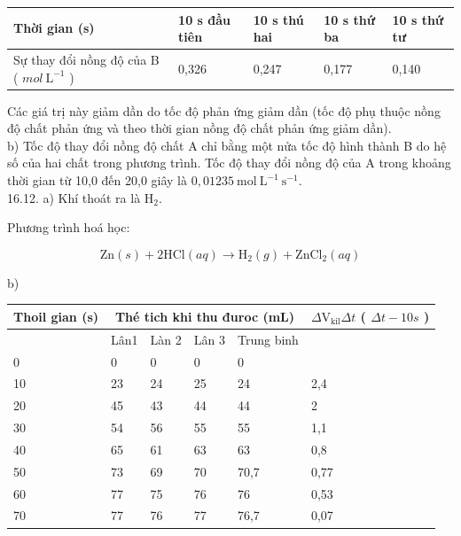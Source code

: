 \documentclass[10pt]{article}
\begin{document}
\begin{center}
\begin{tabular}{|l|l|l|l|l|}
\hline
Thời gian (s) & 10 s đầu tiên & 10 s thú hai & 10 s thứ ba & 10 s thứ tư \\
\hline
Sự thay đổi nồng độ của B ( $m o l \mathrm{~L}^{-1}$ ) & 0,326 & 0,247 & 0,177 & 0,140 \\
\hline
\end{tabular}
\end{center}

Các giá trị này giảm dần do tốc độ phản ứng giảm dần (tốc độ phụ thuộc nồng độ chất phản ứng và theo thời gian nồng độ chất phản ứng giảm dần).\\
b) Tốc độ thay đổi nồng độ chất A chỉ bằng một nửa tốc độ hình thành B do hệ số của hai chất trong phương trình. Tốc độ thay đổi nồng độ của A trong khoảng thời gian từ 10,0 đến 20,0 giây là $0,01235 \mathrm{~mol} \mathrm{~L}^{-1} \mathrm{~s}^{-1}$.\\
16.12. a) Khí thoát ra là $\mathrm{H}_{2}$.

Phương trình hoá học:

$$
\mathrm{Zn}(s)+2 \mathrm{HCl}(a q) \rightarrow \mathrm{H}_{2}(g)+\mathrm{ZnCl}_{2}(a q)
$$

b)

\begin{center}
\begin{tabular}{|l|l|l|l|l|l|}
\hline
\multirow{2}{*}{Thoil gian (s)} & \multicolumn{4}{|c|}{Thé tich khi thu đuroc (mL)} & \multirow{2}{*}{$\Delta \mathrm{V}_{\mathrm{kil}} \Delta t$ ( $\Delta t-10 s$ )} \\
\hline
 & Lân1 & Làn 2 & Lân 3 & Trung binh &  \\
\hline
0 & 0 & 0 & 0 & 0 &  \\
\hline
10 & 23 & 24 & 25 & 24 & 2,4 \\
\hline
20 & 45 & 43 & 44 & 44 & 2 \\
\hline
30 & 54 & 56 & 55 & 55 & 1,1 \\
\hline
40 & 65 & 61 & 63 & 63 & 0,8 \\
\hline
50 & 73 & 69 & 70 & 70,7 & 0,77 \\
\hline
60 & 77 & 75 & 76 & 76 & 0,53 \\
\hline
70 & 77 & 76 & 77 & 76,7 & 0,07 \\
\hline
\end{tabular}
\end{center}
\end{document}

